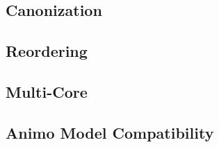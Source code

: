 \subsection{Canonization}

\subsection{Reordering}

\subsection{Multi-Core}

\subsection{Animo Model Compatibility}